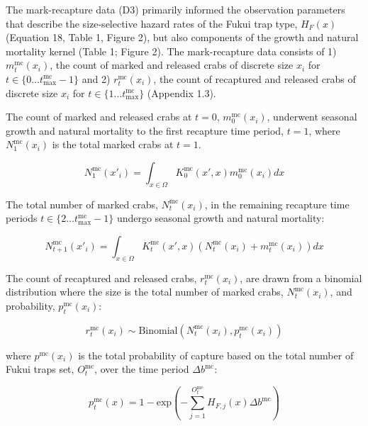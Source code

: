 \documentclass{article}
\begin{document}
The mark-recapture data (D3) primarily informed the observation parameters that describe the size-selective hazard rates of the Fukui trap type, $H_F(x)$ (Equation 18, Table 1, Figure 2), but also components of the growth and natural mortality kernel (Table 1; Figure 2). The mark-recapture data consists of 1) $m_t^{\text{mc}}(x_i)$, the count of marked and released crabs of discrete size $x_i$ for $t \in \{0 \ldots t^\text{mc}_\text{max} - 1\}$ and 2) $r_t^{\text{mc}}(x_i)$, the count of recaptured and released crabs of discrete size $x_i$ for $t \in \{1 \ldots t^\text{mc}_\text{max}\}$ (Appendix 1.3). 

The count of marked and released crabs at $t = 0$, $m_0^{\text{mc}}(x_i)$, underwent seasonal growth and natural mortality to the first recapture time period, $t = 1$, where $N_1^{\text{mc}}(x_i)$ is the total marked crabs at $t = 1$.

\begin{equation}
N_1^{\text{mc}}(x'_i) = \int_{x \in \Omega} K_0^{\text{mc}}(x',x) m_0^{\text{mc}}(x_i)dx
\end{equation}

The total number of marked crabs, $N_t^{\text{mc}}(x_i)$, in the remaining recapture time periods $t \in \{2 \ldots t^\text{mc}_\text{max} - 1\}$ undergo seasonal growth and natural mortality:

\begin{equation}
N_{t+1}^{\text{mc}}(x'_i) = \int_{x \in \Omega} K_t^{\text{mc}}(x',x) (N_t^{\text{mc}}(x_i) + m_t^{\text{mc}}(x_i))dx
\end{equation}

The count of recaptured and released crabs, $r_t^{\text{mc}}(x_i)$, are drawn from a binomial distribution where the size is the total number of marked crabs, $N_t^{\text{mc}}(x_i)$, and probability, $p_t^{\text{mc}}(x_i)$:

\begin{equation}
r_t^{\text{mc}}(x_i) \sim \text{Binomial}(N_t^{\text{mc}}(x_i), p_t^{\text{mc}}(x_i)) 
\end{equation}

where $p^{\text{mc}}(x_i)$ is the total probability of capture based on the total number of Fukui traps set, $O_t^{\text{mc}}$, over the time period $\Delta b^{\text{mc}}$:

\begin{equation}
p_t^{\text{mc}}(x) = 1-\text{exp}\left(-\sum_{j=1}^{O_t^{\text{mc}}} H_{F,j}(x)\Delta b^{\text{mc}}\right)
\end{equation}
\end{document}
